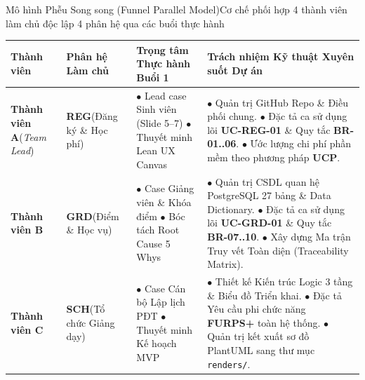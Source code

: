 \documentclass[aspectratio=169, 10pt]{beamer}
\begin{document}
\begin{frame}[t]{Mô hình Phễu Song song (Funnel Parallel Model)}{Cơ chế phối hợp 4 thành viên làm chủ độc lập 4 phân hệ qua các buổi thực hành}
  \vspace{-0.15cm}
  \tiny
  \begin{tabularx}{\linewidth}{@{}P{2.0cm}P{2.4cm}YP{3.8cm}@{}}
    \toprule
    \textbf{Thành viên} & \textbf{Phân hệ Làm chủ} & \textbf{Trọng tâm Thực hành Buổi 1} & \textbf{Trách nhiệm Kỹ thuật Xuyên suốt Dự án} \\
    \midrule
    \textbf{Thành viên A}\newline(\textit{Team Lead}) & 
    \textbf{REG}\newline(Đăng ký \& Học phí) & 
    $\bullet$ Lead case Sinh viên (Slide 5--7)\newline
    $\bullet$ Thuyết minh Lean UX Canvas & 
    $\bullet$ Quản trị GitHub Repo \& Điều phối chung.\newline
    $\bullet$ Đặc tả ca sử dụng lõi \textbf{UC-REG-01} \& Quy tắc \textbf{BR-01..06}.\newline
    $\bullet$ Ước lượng chi phí phần mềm theo phương pháp \textbf{UCP}. \\
    \midrule
    \textbf{Thành viên B} & 
    \textbf{GRD}\newline(Điểm \& Học vụ) & 
    $\bullet$ Case Giảng viên \& Khóa điểm\newline
    $\bullet$ Bóc tách Root Cause 5 Whys & 
    $\bullet$ Quản trị CSDL quan hệ PostgreSQL 27 bảng \& Data Dictionary.\newline
    $\bullet$ Đặc tả ca sử dụng lõi \textbf{UC-GRD-01} \& Quy tắc \textbf{BR-07..10}.\newline
    $\bullet$ Xây dựng Ma trận Truy vết Toàn diện (Traceability Matrix). \\
    \midrule
    \textbf{Thành viên C} & 
    \textbf{SCH}\newline(Tổ chức Giảng dạy) & 
    $\bullet$ Case Cán bộ Lập lịch PĐT\newline
    $\bullet$ Thuyết minh Kế hoạch MVP & 
    $\bullet$ Thiết kế Kiến trúc Logic 3 tầng \& Biểu đồ Triển khai.\newline
    $\bullet$ Đặc tả Yêu cầu phi chức năng \textbf{FURPS+} toàn hệ thống.\newline
    $\bullet$ Quản trị kết xuất sơ đồ PlantUML sang thư mục \texttt{renders/}. \\

\end{tabularx}
\end{frame}
\end{document}
